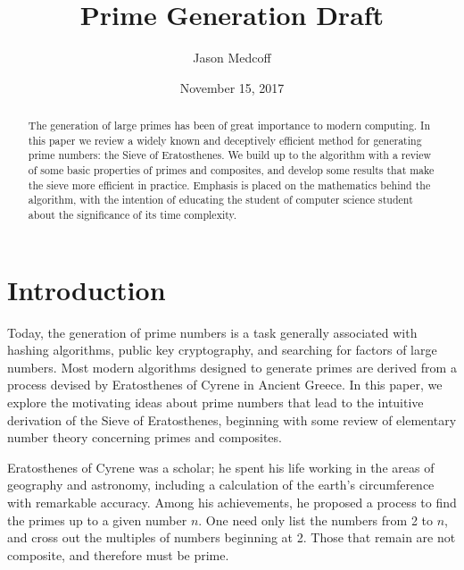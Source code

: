 \documentclass{amsart}
\title{Prime Generation Draft}
\author{Jason Medcoff}
\date{November 15, 2017}
\theoremstyle{definition}
\theoremstyle{case}
\begin{document}
    \maketitle
    
    \begin{abstract}
    	The generation of large primes has been of great importance to modern computing. In this paper we review a widely known and deceptively efficient method for generating prime numbers: the Sieve of Eratosthenes. We build up to the algorithm with a review of some basic properties of primes and composites, and develop some results that make the sieve more efficient in practice.
    	Emphasis is placed on the mathematics behind the algorithm, with the intention of educating the student of computer science student about the significance of its time complexity.
    \end{abstract}
    
    
    
    \section{Introduction}
    
    Today, the generation of prime numbers is a task generally associated with hashing algorithms, public key cryptography, and searching for factors of large numbers. Most modern algorithms designed to generate primes are derived from a process devised by Eratosthenes of Cyrene in Ancient Greece. In this paper, we explore the motivating ideas about prime numbers that lead to the intuitive derivation of the Sieve of Eratosthenes, beginning with some review of elementary number theory concerning primes and composites.
    
    Eratosthenes of Cyrene was a scholar; he spent his life working in the areas of geography and astronomy, including a calculation of the earth's circumference with remarkable accuracy. Among his achievements, he proposed a process to find the primes up to a given number $n$. One need only list the numbers from 2 to $n$, and cross out the multiples of numbers beginning at 2. Those that remain are not composite, and therefore must be prime.
    
\end{document}
